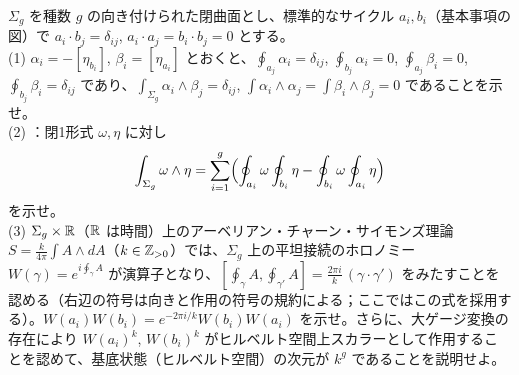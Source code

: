 \begin{problem}[難易度 C]\label{ch06-prob-sigmag}
$\Sigma_g$ を種数 $g$ の向き付けられた閉曲面とし、標準的なサイクル $a_i,b_i$（基本事項の図）で $a_i\cdot b_j=\delta_{ij}$, $a_i\cdot a_j=b_i\cdot b_j=0$ とする。\\
(1) $\alpha_i=-[\eta_{b_i}]$, $\beta_i=[\eta_{a_i}]$ とおくと、$\oint_{a_j}\alpha_i=\delta_{ij}$, $\oint_{b_j}\alpha_i=0$, $\oint_{a_j}\beta_i=0$, $\oint_{b_j}\beta_i=\delta_{ij}$ であり、$\int_{\Sigma_g}\alpha_i\wedge\beta_j=\delta_{ij}$, $\int\alpha_i\wedge\alpha_j=\int\beta_i\wedge\beta_j=0$ であることを示せ。\\
(2) ：閉1形式 $\omega,\eta$ に対し
\[
\int_{\Sigma_g}\omega\wedge\eta=\sum_{i=1}^g\Bigl(\oint_{a_i}\omega\oint_{b_i}\eta-\oint_{b_i}\omega\oint_{a_i}\eta\Bigr)
\]
を示せ。\\
(3) $\Sigma_g\times\mathbb{R}$（$\mathbb{R}$ は時間）上のアーベリアン・チャーン・サイモンズ理論 $S=\frac{k}{4\pi}\int A\wedge dA$（$k\in\mathbb{Z}_{>0}$）では、$\Sigma_g$ 上の平坦接続のホロノミー $W(\gamma)=e^{i\oint_\gamma A}$ が演算子となり、$[\oint_{\gamma}A,\oint_{\gamma'}A]=\frac{2\pi i}{k}\,(\gamma\cdot\gamma')$ をみたすことを認める（右辺の符号は向きと作用の符号の規約による；ここではこの式を採用する）。$W(a_i)W(b_i)=e^{-2\pi i/k}W(b_i)W(a_i)$ を示せ。さらに、大ゲージ変換の存在により $W(a_i)^k$, $W(b_i)^k$ がヒルベルト空間上スカラーとして作用することを認めて、基底状態（ヒルベルト空間）の次元が $k^g$ であることを説明せよ。
\end{problem}

